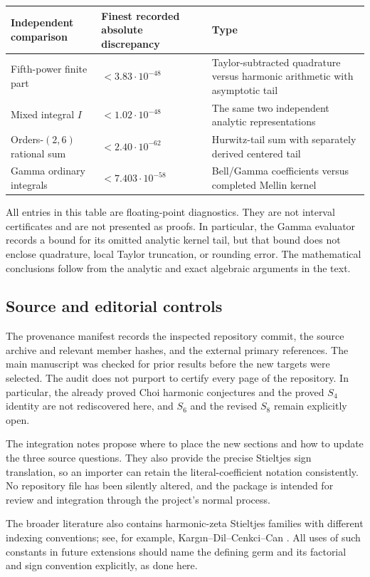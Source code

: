 \begin{center}
\small
\begin{tabular}{@{}>{\raggedright\arraybackslash}p{}>{\raggedright\arraybackslash}p{}>{\raggedright\arraybackslash}p{}@{}}
\toprule
Independent comparison & Finest recorded absolute discrepancy & Type \\
\midrule
Fifth-power finite part & $<3.83\cdot10^{-48}$ & Taylor-subtracted
quadrature versus harmonic arithmetic with asymptotic tail \\[4pt]
Mixed integral $I$ & $<1.02\cdot10^{-48}$ & The same two independent
analytic representations \\[4pt]
Orders-$(2,6)$ rational sum & $<2.40\cdot10^{-62}$ & Hurwitz-tail
sum with separately derived centered tail \\[4pt]
Gamma ordinary integrals & $<7.403\cdot10^{-58}$ & Bell/Gamma
coefficients versus completed Mellin kernel \\
\bottomrule
\end{tabular}
\end{center}

All entries in this table are floating-point diagnostics. They are
not interval certificates and are not presented as proofs. In
particular, the Gamma evaluator records a bound for its omitted
analytic kernel tail, but that bound does not enclose quadrature,
local Taylor truncation, or rounding error. The mathematical
conclusions follow from the analytic and exact algebraic arguments
in the text.

\subsection{Source and editorial controls}

The provenance manifest records the inspected repository commit,
the source archive and relevant member hashes, and the external
primary references. The main manuscript was checked for prior
results before the new targets were selected. The audit does not
purport to certify every page of the repository. In particular,
the already proved Choi harmonic conjectures and the proved $S_4$
identity are not rediscovered here, and $S_6$ and the revised $S_8$
remain explicitly open.

The integration notes propose where to place the new sections and
how to update the three source questions. They also provide the
precise Stieltjes sign translation, so an importer can retain the
literal-coefficient notation consistently. No repository file has
been silently altered, and the package is intended for review and
integration through the project's normal process.

The broader literature also contains harmonic-zeta Stieltjes
families with different indexing conventions; see, for example,
Karg\i n--Dil--Cenkci--Can \cite{Kargin}. All uses of such constants
in future extensions should name the defining germ and its
factorial and sign convention explicitly, as done here.
